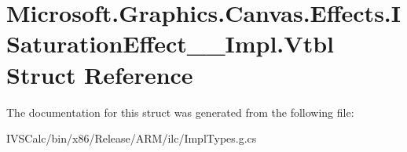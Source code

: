 \hypertarget{struct_microsoft_1_1_graphics_1_1_canvas_1_1_effects_1_1_i_saturation_effect_____impl_1_1_vtbl}{}\section{Microsoft.\+Graphics.\+Canvas.\+Effects.\+I\+Saturation\+Effect\+\_\+\+\_\+\+Impl.\+Vtbl Struct Reference}
\label{struct_microsoft_1_1_graphics_1_1_canvas_1_1_effects_1_1_i_saturation_effect_____impl_1_1_vtbl}


The documentation for this struct was generated from the following file\+:\begin{DoxyCompactItemize}
\item 
I\+V\+S\+Calc/bin/x86/\+Release/\+A\+R\+M/ilc/Impl\+Types.\+g.\+cs\end{DoxyCompactItemize}
